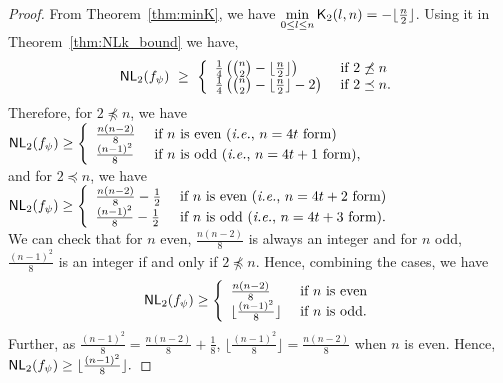 \documentclass{llncs}
\begin{document}
\begin{proof}
From Theorem~\ref{thm:minK}, we have 
$\min\limits_{0 \leq l \leq n} \mathsf{K}_{2}(l,n) = -\lfloor \frac{n}{2} \rfloor$. 
Using it in Theorem~\ref{thm:NLk_bound} we have,
$$\mathsf{NL}_{2}(f_\psi) ~\geq ~ 
\left\{ \begin{array}{ll}
\frac{1}{4}\left({n \choose 2} - \lfloor \frac{n}{2} \rfloor\right)  & \text{ if }  2 \not\preceq n \\
\frac{1}{4}\left({n \choose 2} -\lfloor \frac{n}{2} \rfloor - 2\right) & \text{ if } 2 \preceq n.
\end{array}   \right.$$
Therefore, for $2 \npreceq n$, we have
$\mathsf{NL}_{2}(f_\psi) \geq \left\{
\begin{array}{ll}
 \frac{n(n-2)}{8} & \text{ if } n \text{ is even (\textit{i.e.}, $n = 4t$ form)}\\
 \frac{(n-1)^2}{8} & \text{ if } n \text{ is odd (\textit{i.e.}, $n = 4t+1$ form)},
\end{array} \right.$\\
and for $2 \preceq n$, we have 
$\mathsf{NL}_{2}(f_\psi) \geq \left\{
\begin{array}{ll}
 \frac{n(n-2)}{8}-\frac{1}{2} & \text{ if } n \text{ is even (\textit{i.e.}, $n = 4t+2$ form)} \\
 \frac{(n-1)^2}{8}-\frac{1}{2} & \text{ if } n \text{ is odd (\textit{i.e.}, $n = 4t+3$ form)}.
\end{array} \right.$\\
We can check that for $n$ even, $\frac{n(n-2)}{8}$ is always an integer and for 
$n$ odd, $\frac{(n-1)^2}{8}$ is an integer if and only if $2 \npreceq n$. Hence, combining the cases, we have 
$$\mathsf{NL}_{2}(f_\psi) \geq \left\{
\begin{array}{ll}
 \frac{n(n-2)}{8} & \text{ if } n \text{ is even} \\
 \lfloor\frac{(n-1)^2}{8}\rfloor & \text{ if } n \text{ is odd}.
\end{array} \right.$$
Further, as $\frac{(n-1)^2}{8} = \frac{n(n-2)}{8} +\frac{1}{8}$, $\lfloor\frac{(n-1)^2}{8}\rfloor = \frac{n(n-2)}{8}$ when $n$ is even. Hence,
$\mathsf{NL}_{2}(f_\psi) \geq \lfloor\frac{(n-1)^2}{8}\rfloor.$


\end{proof}
\end{document}
